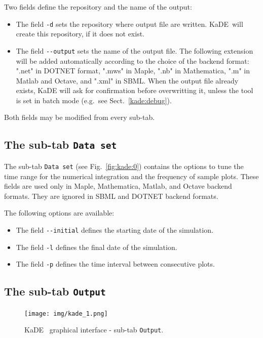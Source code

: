 \documentclass[11pt]{book}
\def\KaDE{\textsf{KaDE}}
\begin{document}
Two fields define the repository and the name of the output:
\begin{itemize}
\item The field \texttt{-d} sets  the repository where output file are written. \KaDE~will create this repository, if it does not exist.
\item The field \texttt{-{}-output} sets the name of the output file.
The following extension will be added automatically according to the choice of the backend format: ".net" in DOTNET format, ".mws" in Maple, ".nb" in Mathematica, ".m" in Matlab and Octave, and ".xml" in SBML. When the output file already exists, {\KaDE} will ask for confirmation before overwritting it, unless the tool is set in batch mode (e.g.~see Sect.~\ref{kade:debug}).
\end{itemize}
Both fields may be modified from every sub-tab.




\subsection{The sub-tab \texttt{Data set}}

The sub-tab \texttt{Data set} (see Fig.~\ref{fig:kade:0}) contains the options to tune the time range for the numerical integration and the frequency of sample plots. These fields are used only in Maple, Mathematica, Matlab, and Octave backend formats.
They are ignored in SBML and DOTNET backend formats.

The following options are available:
\begin{itemize}
\item The field \texttt{-{}-initial} defines the starting date of the simulation.
\item The field \texttt{-l} defines the final date of the simulation.
\item The field \texttt{-p} defines the time interval between consecutive plots.
\end{itemize}

\subsection{The sub-tab \texttt{Output}}

\begin{figure}[htbp]
\centering
\texttt{[image: img/kade\_1.png]}
\caption{\KaDE~ graphical interface - sub-tab \texttt{Output}.}
\label{fig:kade:1}
\end{figure}
\end{document}
